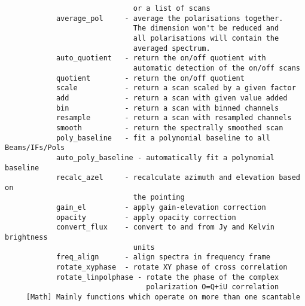 \documentclass[11pt]{article}
\begin{document}
\begin{verbatim}
                              or a list of scans
            average_pol     - average the polarisations together.
                              The dimension won't be reduced and
                              all polarisations will contain the
                              averaged spectrum.
            auto_quotient   - return the on/off quotient with
                              automatic detection of the on/off scans
            quotient        - return the on/off quotient
            scale           - return a scan scaled by a given factor
            add             - return a scan with given value added
            bin             - return a scan with binned channels
            resample        - return a scan with resampled channels
            smooth          - return the spectrally smoothed scan
            poly_baseline   - fit a polynomial baseline to all Beams/IFs/Pols
            auto_poly_baseline - automatically fit a polynomial baseline
            recalc_azel     - recalculate azimuth and elevation based on
                              the pointing
            gain_el         - apply gain-elevation correction
            opacity         - apply opacity correction
            convert_flux    - convert to and from Jy and Kelvin brightness
                              units
            freq_align      - align spectra in frequency frame
            rotate_xyphase  - rotate XY phase of cross correlation
            rotate_linpolphase - rotate the phase of the complex
                                 polarization O=Q+iU correlation
     [Math] Mainly functions which operate on more than one scantable


\end{verbatim}
\end{document}

